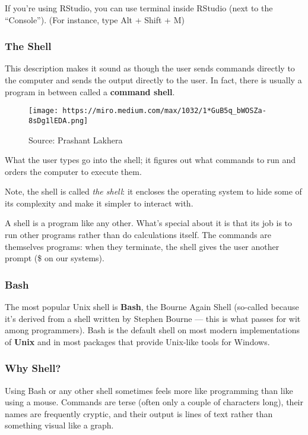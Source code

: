 \documentclass[
]{book}
\begin{document}
If you're using RStudio, you can use terminal inside RStudio (next to the ``Console''). (For instance, type Alt + Shift + M)

\hypertarget{the-shell}{%
\subsubsection{The Shell}\label{the-shell}}

This description makes it sound as though the user sends commands directly to the computer and sends the output directly to the user. In fact, there is usually a program in between called a \textbf{command shell}.

\begin{figure}
\centering
\texttt{[image: https://miro.medium.com/max/1032/1*GuB5q\_bWOSZa-8sDg1lEDA.png]}
\caption{Source: Prashant Lakhera}
\end{figure}

What the user types go into the shell; it figures out what commands to run and orders the computer to execute them.

Note, the shell is called \emph{the shell}: it encloses the operating system to hide some of its complexity and make it simpler to interact with.

A shell is a program like any other. What's special about it is that its job is to run other programs rather than do calculations itself. The commands are themselves programs: when they terminate, the shell gives the user another prompt (\$ on our systems).

\hypertarget{bash}{%
\subsubsection{Bash}\label{bash}}

The most popular Unix shell is \textbf{Bash}, the Bourne Again Shell (so-called because it's derived from a shell written by Stephen Bourne --- this is what passes for wit among programmers). Bash is the default shell on most modern implementations of \textbf{Unix} and in most packages that provide Unix-like tools for Windows.

\hypertarget{why-shell}{%
\subsubsection{Why Shell?}\label{why-shell}}

Using Bash or any other shell sometimes feels more like programming than like using a mouse. Commands are terse (often only a couple of characters long), their names are frequently cryptic, and their output is lines of text rather than something visual like a graph.
\end{document}
